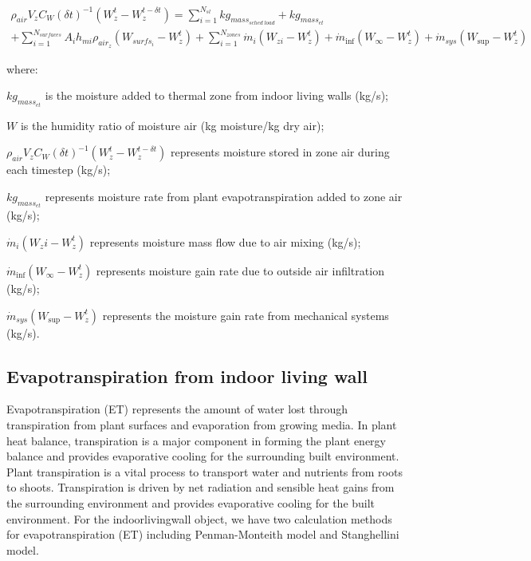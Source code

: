 \begin{equation}
\begin{array}{l}{\rho_{air}}{V_z}{C_W}{\left( {\delta t} \right)^{ - 1}}\left( {W_z^t - W_z^{t - \delta t}} \right) = \sum\limits_{i = 1}^{{N_{sl}}} {k{g_{mas{s_{sched\;load}}}}} + kg_{mass_{et}} \\ + \sum\limits_{i = 1}^{{N_{surfaces}}} {{A_i}{h_{mi}}} {\rho_{ai{r_z}}}\left( {{W_{surf{s_i}}} - W_z^t} \right)+ \sum\limits_{i = 1}^{{N_{zones}}} {{{\dot m}_i}} \left( {{W_{zi}} - W_z^t} \right) + {{\dot m}_{\inf }}\left( {{W_\infty } - W_z^t} \right) + {{\dot m}_{sys}}\left( {{W_{\sup }} - W_z^t} \right)\end{array}
\end{equation}

where:
 
\(kg_{mass_{et}}\) is the moisture added to thermal zone from indoor living walls (kg/s);
 
\(W\) is the humidity ratio of moisture air (kg moisture/kg dry air);  

\({\rho_{air}}{V_z}{C_W}{({\delta t})^{ - 1}}({W_z^t - W_z^{t - \delta t}})\) represents moisture stored in zone air during each timestep (kg/s);

\(kg_{mass_{et}}\) represents moisture rate from plant evapotranspiration added to zone air (kg/s);
 
\({{{\dot m}_i}} \left( {W_zi - W_z^t} \right)\) represents moisture mass flow due to air mixing (kg/s);
  
\({{\dot m}_{\inf }}\left( {{W_\infty } - W_z^t} \right)\) represents moisture gain rate due to outside air infiltration (kg/s);
  
\({{\dot m}_{sys}}\left( {{W_{\sup }} - W_z^t} \right)\) represents the moisture gain rate from mechanical systems (kg/s).
  
\subsection{Evapotranspiration from indoor living wall}\label{evaporation-from-indoor-living-wall}

Evapotranspiration (ET) represents the amount of water lost through transpiration from plant surfaces and evaporation from growing media. In plant heat balance, transpiration is a major component in forming the plant energy balance and provides evaporative cooling for the surrounding built environment. Plant transpiration is a vital process to transport water and nutrients from roots to shoots. Transpiration is driven by net radiation and sensible heat gains from the surrounding environment and provides evaporative cooling for the built environment. For the indoorlivingwall object, we have two calculation methods for evapotranspiration (ET) including Penman-Monteith model and Stanghellini model. 

